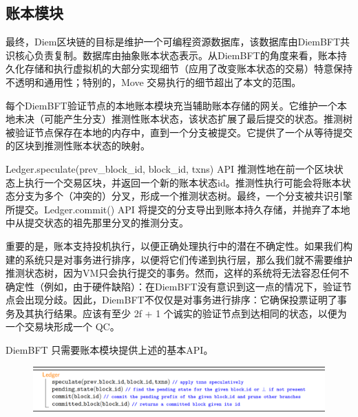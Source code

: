 
      

\subsection{账本模块}

最终，Diem区块链的目标是维护一个可编程资源数据库，该数据库由DiemBFT共识核心负责复制。数据库由抽象账本状态表示。从DiemBFT的角度来看，账本持久化存储和执行虚拟机的大部分实现细节（应用了改变账本状态的交易）特意保持不透明和通用性；特别的，Move 交易执行的细节超出了本文的范围。

每个DiemBFT验证节点的本地账本模块充当辅助账本存储的网关。它维护一个本地未决（可能产生分支）推测性账本状态，该状态扩展了最后提交的状态。推测树被验证节点保存在本地的内存中，直到一个分支被提交。它提供了一个从等待提交的区块到推测性账本状态的映射。

Ledger.speculate(prev\_block\_id, block\_id, txns) API 推测性地在前一个区块状态上执行一个交易区块，并返回一个新的账本状态id。推测性执行可能会将账本状态分支为多个（冲突的）分叉，形成一个推测状态树。最终，一个分支被共识引擎所提交。Ledger.commit() API 将提交的分支导出到账本持久存储，并抛弃了本地中从提交状态的祖先那里分叉的推测分支。

重要的是，账本支持投机执行，以便正确处理执行中的潜在不确定性。如果我们构建的系统只是对事务进行排序，以便将它们传递到执行层，那么我们就不需要维护推测状态树，因为VM只会执行提交的事务。然而，这样的系统将无法容忍任何不确定性（例如，由于硬件缺陷）：在DiemBFT没有意识到这一点的情况下，验证节点会出现分歧。因此，DiemBFT不仅仅是对事务进行排序：它确保投票证明了事务及其执行结果。应该有至少 2f + 1 个诚实的验证节点到达相同的状态，以便为一个交易块形成一个 QC。

DiemBFT 只需要账本模块提供上述的基本API。

\begin{figure}[htbp]
    \centering
    \includegraphics[width=12cm]{figures/code2.png}
\end{figure}

